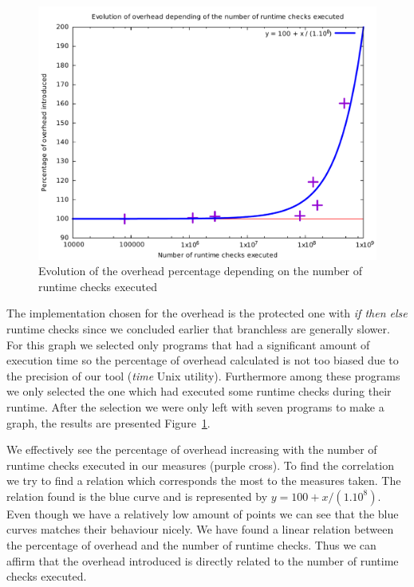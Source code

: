 \documentclass[11pt]{sdm}
\begin{document}
\begin{figure}[!ht]
\centering
\includegraphics[width=1\textwidth]{images/correlation_graph.pdf}
\caption{Evolution of the overhead percentage depending on the number of runtime checks executed}
\label{correlation_graph}
\end{figure}

The implementation chosen for the overhead is the protected one with \textit{if then else} runtime checks since we concluded earlier that branchless are generally slower.
For this graph we selected only programs that had a significant amount of execution time so the percentage of overhead calculated is not too biased due to the precision of our tool (\textit{time} Unix utility). Furthermore among these programs we only selected the one which had executed some runtime checks during their runtime. 
After the selection we were only left with seven programs to make a graph, the results are presented Figure~\ref{correlation_graph}.

We effectively see the percentage of overhead increasing with the number of runtime checks executed in our measures (purple cross). To find the correlation we try to find a relation which corresponds the most to the measures taken. The relation found is the blue curve and is represented by $y=100+x/(1.10^8)$. Even though we have a relatively low amount of points we can see that the blue curves matches their behaviour nicely. We have found a linear relation between the percentage of overhead and the number of runtime checks. Thus we can affirm that the overhead introduced is directly related to the number of runtime checks executed.
\end{document}
